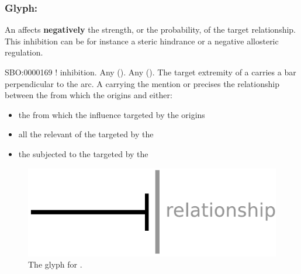 
\subsubsection{Glyph: }\label{sec:inhibition}

An  affects \textbf{negatively}  the strength, or the probability, of the target relationship. This inhibition can be for instance a steric hindrance or a negative allosteric regulation.

\begin{glyphDescription}
 \glyphSboTerm SBO:0000169 ! inhibition.
 \glyphOrigin Any  ().
 \glyphTarget Any  ().
 \glyphEndPoint The target extremity of a  carries a bar perpendicular to the arc.
 \glyphAux A  carrying the mention  or  precises the relationship between the  from which the  origins and either:
\begin{itemize}
\item the  from which the influence targeted by the  origins
\item all the relevant  of the  targeted by the 
\item the  subjected to the  targeted by the 
\end{itemize}
 \end{glyphDescription}

\begin{figure}[H]
  \centering
  \includegraphics[scale = 0.5]{images/inhibition}
  \caption{The \ER glyph for .}
  \label{fig:inhibition}
\end{figure}

